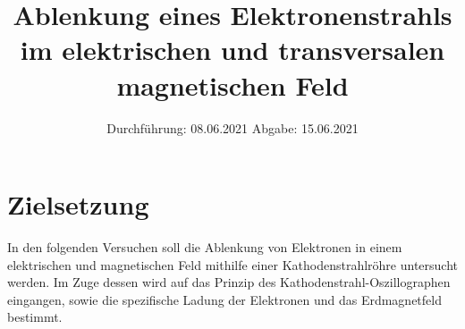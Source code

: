 

\subject{V501, V502}
\title{Ablenkung eines Elektronenstrahls im elektrischen und transversalen magnetischen Feld}
\date{
    Durchführung: 08.06.2021
    \hspace{3em}
    Abgabe: 15.06.2021
}



\maketitle
\thispagestyle{empty}
\tableofcontents
\newpage

\section{Zielsetzung}

    In den folgenden Versuchen soll die Ablenkung von Elektronen in einem elektrischen und magnetischen Feld mithilfe einer Kathodenstrahlröhre untersucht werden.
    Im Zuge dessen wird auf das Prinzip des Kathodenstrahl-Oszillographen eingangen,
    sowie die spezifische Ladung der Elektronen und das Erdmagnetfeld bestimmt.


\clearpage


\clearpage


\clearpage


\clearpage

\printbibliography


